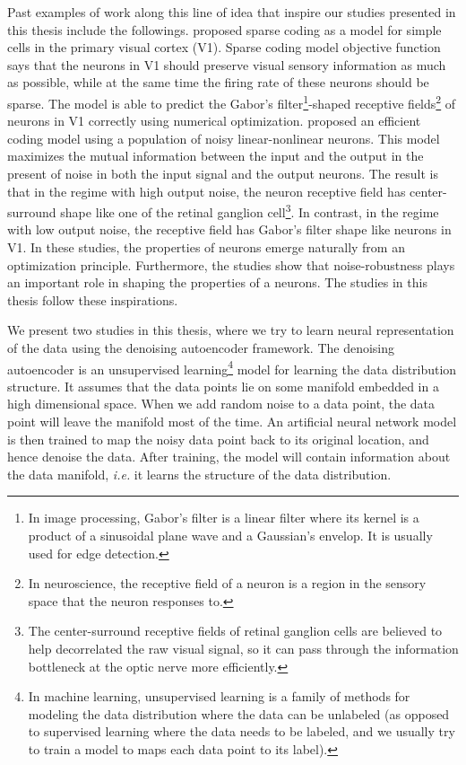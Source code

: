 Past examples of work along this line of idea that inspire our studies presented in this thesis include the followings. \textcite{ob96} proposed sparse coding as a model for simple cells in the primary visual cortex (V1). Sparse coding model objective function says that the neurons in V1 should preserve visual sensory information as much as possible, while at the same time the firing rate of these neurons should be sparse. The model is able to predict the Gabor's filter\footnote{In image processing, Gabor's filter is a linear filter where its kernel is a product of a sinusoidal plane wave and a Gaussian's envelop. It is usually used for edge detection.}-shaped receptive fields\footnote{In neuroscience, the receptive field of a neuron is a region in the sensory space that the neuron responses to.} of neurons in V1 correctly using numerical optimization. \textcite{ky11} proposed an efficient coding model using a population of noisy linear-nonlinear neurons. This model maximizes the mutual information between the input and the output in the present of noise in both the input signal and the output neurons. The result is that in the regime with high output noise, the neuron receptive field has center-surround shape like one of the retinal ganglion cell\footnote{The center-surround receptive fields of retinal ganglion cells are believed to help decorrelated the raw visual signal, so it can pass through the information bottleneck at the optic nerve more efficiently.}. In contrast, in the regime with low output noise, the receptive field has Gabor's filter shape like neurons in V1. In these studies, the properties of neurons emerge naturally from an optimization principle. Furthermore, the studies show that noise-robustness plays an important role in shaping the properties of a neurons. The studies in this thesis follow these inspirations.

We present two studies in this thesis, where we try to learn neural representation of the data using the denoising autoencoder framework. The denoising autoencoder is an unsupervised learning\footnote{In machine learning, unsupervised learning is a family of methods for modeling the data distribution where the data can be unlabeled (as opposed to supervised learning where the data needs to be labeled, and we usually try to train a model to maps each data point to its label).} model for learning the data distribution structure. It assumes that the data points lie on some manifold embedded in a high dimensional space. When we add random noise to a data point, the data point will leave the manifold most of the time. An artificial neural network model is then trained to map the noisy data point back to its original location, and hence denoise the data. After training, the model will contain information about the data manifold, \textit{i.e.} it learns the structure of the data distribution.

